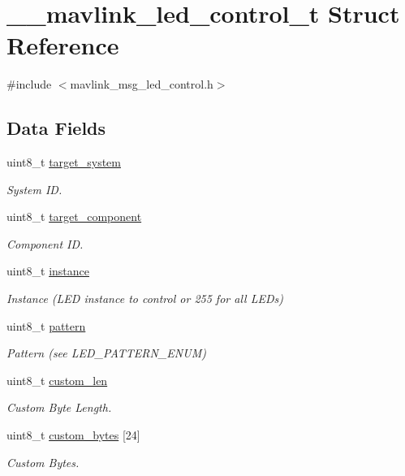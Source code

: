 \hypertarget{struct____mavlink__led__control__t}{\section{\+\_\+\+\_\+mavlink\+\_\+led\+\_\+control\+\_\+t Struct Reference}
\label{struct____mavlink__led__control__t}
}


{\ttfamily \#include $<$mavlink\+\_\+msg\+\_\+led\+\_\+control.\+h$>$}

\subsection*{Data Fields}
\begin{DoxyCompactItemize}
\item 
uint8\+\_\+t \hyperlink{struct____mavlink__led__control__t_a9e1be304a169044dcc57c7c5fe1045f7}{target\+\_\+system}
\begin{DoxyCompactList}\small\item\em System I\+D. \end{DoxyCompactList}\item 
uint8\+\_\+t \hyperlink{struct____mavlink__led__control__t_a42de323f5b5693976f3591d5494c5dc6}{target\+\_\+component}
\begin{DoxyCompactList}\small\item\em Component I\+D. \end{DoxyCompactList}\item 
uint8\+\_\+t \hyperlink{struct____mavlink__led__control__t_a4ae3c685fc2554e784aa50d245fbb26c}{instance}
\begin{DoxyCompactList}\small\item\em Instance (L\+E\+D instance to control or 255 for all L\+E\+Ds) \end{DoxyCompactList}\item 
uint8\+\_\+t \hyperlink{struct____mavlink__led__control__t_a74eea064ff503c2144ac3749592ddb6f}{pattern}
\begin{DoxyCompactList}\small\item\em Pattern (see L\+E\+D\+\_\+\+P\+A\+T\+T\+E\+R\+N\+\_\+\+E\+N\+U\+M) \end{DoxyCompactList}\item 
uint8\+\_\+t \hyperlink{struct____mavlink__led__control__t_a1559f99f9f2eea8df7d5d266f243d76f}{custom\+\_\+len}
\begin{DoxyCompactList}\small\item\em Custom Byte Length. \end{DoxyCompactList}\item 
uint8\+\_\+t \hyperlink{struct____mavlink__led__control__t_ac69755fe7a5786b3003d745da1652522}{custom\+\_\+bytes} \mbox{[}24\mbox{]}
\begin{DoxyCompactList}\small\item\em Custom Bytes. \end{DoxyCompactList}\end{DoxyCompactItemize}


